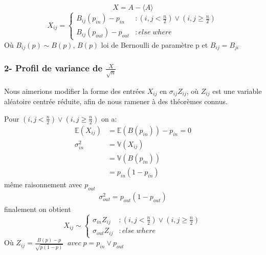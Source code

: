 \begin{equation}
X = A - \langle A \rangle\nonumber
\end{equation}
\begin{equation}
	X_{ij}  = \left\{
	\begin{array}{lr}
		B_{ij}(p_{in}) - p_{in} & : (i,j < \frac{n}{2}) \lor (i,j \ge \frac{n}{2}) \\
		B_{ij}(p_{out}) - p_{out} & : else \; where
	\end{array}
\right.\nonumber
\end{equation}
Où $B_{ij}(p) \sim B(p)$, $B(p)$ loi de Bernoulli de paramètre p et $B_{ij} = B_{ji}$\\


\subsubsection*{2- Profil de variance de $\frac{X}{\sqrt{n}}$}
Nous aimerions modifier la forme des entrées $X_{ij}$ en $\sigma_{ij} Z_{ij}$, où $Z_{ij}$ est une variable aléatoire centrée réduite, afin de nous ramener à des théorèmes connus.

Pour $(i,j < \frac{n}{2}) \lor (i,j \ge \frac{n}{2}) $ on a:
\begin{align*}
\mathbb{E}(X_{ij}) &= \mathbb{E}(B(p_{in}))- p_{in} = 0\\
\sigma_{in}^2 &= \mathbb{V}(X_{ij}) \\ 
			  &= \mathbb{V}(B(p_{in})) \\
			  &= p_{in} (1 - p_{in})
\end{align*}
même raisonnement avec $p_{out}$ 
\begin{align*}
\sigma_{out}^2 =  p_{out} (1 - p_{out})
\end{align*}
finalement on obtient 
\begin{equation}
	X_{ij} \sim \left\{
	\begin{array}{lr}
		\sigma_{in} Z_{ij} & : (i,j < \frac{n}{2}) \lor (i,j \ge \frac{n}{2}) \\
		\sigma_{out} Z_{ij} & : else \; where
	\end{array}
\right.\nonumber
\end{equation}
Où $Z_{ij} = \frac{B(p) - p}{\sqrt{p(1-p)}} \;\;avec \; p = p_{in} \lor p_{out}$\\

